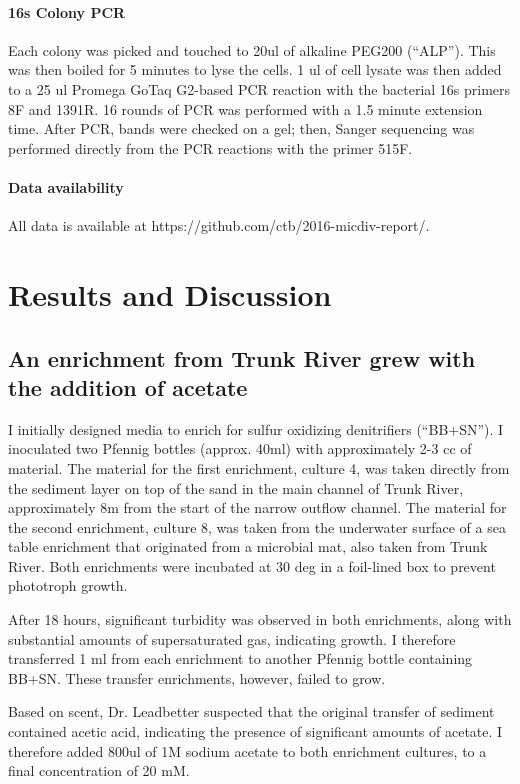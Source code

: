 \documentclass{article}
\begin{document}
\paragraph{16s Colony PCR} Each colony was picked and touched to 20ul of
alkaline PEG200 (``ALP'').  This was then boiled for 5 minutes to lyse
the cells. 1 ul of cell lysate was then added to a 25 ul Promega GoTaq
G2-based PCR reaction with the bacterial 16s primers 8F and 1391R.  16
rounds of PCR was performed with a 1.5 minute extension time.  After
PCR, bands were checked on a gel; then,
Sanger sequencing was performed directly from the PCR reactions with
the primer 515F.

\paragraph{Data availability}

All data is available at https://github.com/ctb/2016-micdiv-report/.

\section*{Results and Discussion}

\subsection*{An enrichment from Trunk River grew with the addition of acetate}

I initially designed media to enrich for sulfur oxidizing denitrifiers
(``BB+SN'').  I inoculated two Pfennig bottles (approx. 40ml)
with approximately 2-3 cc of material.  The material for the first
enrichment, culture 4, was taken directly from the sediment layer on
top of the sand in the main channel of Trunk River, approximately 8m
from the start of the narrow outflow channel. The material for the
second enrichment, culture 8, was taken from the underwater surface of
a sea table enrichment that originated from a microbial mat, also
taken from Trunk River.  Both enrichments were incubated at 30 deg
in a foil-lined box to prevent phototroph growth.

After 18 hours, significant turbidity was observed in both
enrichments, along with substantial amounts of supersaturated gas,
indicating growth.  I therefore transferred 1 ml from each enrichment
to another Pfennig bottle containing BB+SN.  These transfer
enrichments, however, failed to grow.

Based on scent, Dr. Leadbetter suspected that the original transfer of
sediment contained acetic acid, indicating the presence of significant
amounts of acetate.  I therefore added 800ul of 1M sodium acetate to
both enrichment cultures, to a final concentration of 20 mM.
\end{document}
